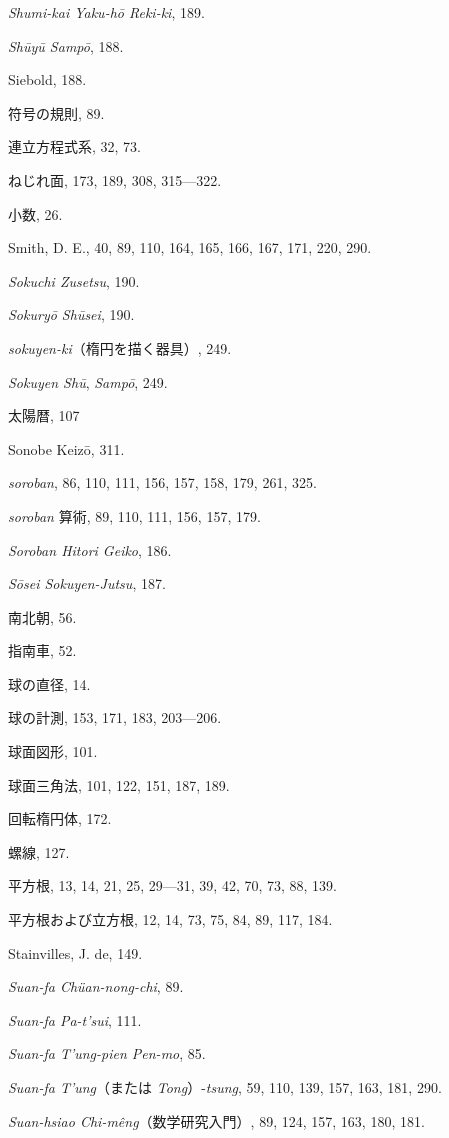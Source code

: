 \documentclass[11pt]{article}
\begin{document}
\emph{Shumi-kai Yaku-hō Reki-ki}, 189.\par
\emph{Shūyū Sampō}, 188.\par
Siebold, 188.\par
符号の規則, 89.\par
連立方程式系, 32, 73.\par
ねじれ面, 173, 189, 308, 315---322.\par
小数, 26.\par
Smith, D. E., 40, 89, 110, 164, 165, 166, 167, 171, 220, 290.\par
\emph{Sokuchi Zusetsu}, 190.\par
\emph{Sokuryō Shūsei}, 190.\par
\emph{sokuyen-ki}（楕円を描く器具）, 249.\par
\emph{Sokuyen Shū}, \emph{Sampō}, 249.\par
太陽暦, 107\par
Sonobe Keizō, 311.\par
\emph{soroban}, 86, 110, 111, 156, 157, 158, 179, 261, 325.\par
\emph{soroban} 算術, 89, 110, 111, 156, 157, 179.\par
\emph{Soroban Hitori Geiko}, 186.\par
\emph{Sōsei Sokuyen-Jutsu}, 187.\par
南北朝, 56.\par
指南車, 52.\par
球の直径, 14.\par
球の計測, 153, 171, 183, 203---206.\par
球面図形, 101.\par
球面三角法, 101, 122, 151, 187, 189.\par
回転楕円体, 172.\par
螺線, 127.\par
平方根, 13, 14, 21, 25, 29---31, 39, 42, 70, 73, 88, 139.\par
平方根および立方根, 12, 14, 73, 75, 84, 89, 117, 184.\par
Stainvilles, J. de, 149.\par
\emph{Suan-fa Chüan-nong-chi}, 89.\par
\emph{Suan-fa Pa-t'sui}, 111.\par
\emph{Suan-fa T'ung-pien Pen-mo}, 85.\par
\emph{Suan-fa T'ung}（または \emph{Tong}）-\emph{tsung}, 59, 110, 139, 157, 163, 181, 290.\par
\emph{Suan-hsiao Chi-mêng}（数学研究入門）, 89, 124, 157, 163, 180, 181.\par
\end{document}

